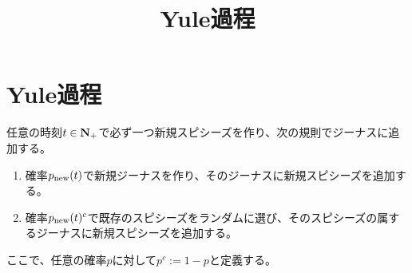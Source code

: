 \documentclass{jsarticle}
\title{Yule過程}
\author{}
\newcommand{\new}{\op{new}}
\begin{document}
\section{Yule過程}\label{sec:Yule過程}

\begin{procedure}\label{pro:Yule過程}
	任意の時刻$t\in\mathbf{N}_+$で必ず一つ新規スピシーズを作り、次の規則でジーナスに追加する。
\begin{enumerate}\setlength{\itemsep}{-1mm} %
	\item 確率$p_\new(t)$で新規ジーナスを作り、そのジーナスに新規スピシーズを追加する。
	\item 確率$p_\new(t)^c$で既存のスピシーズをランダムに選び、そのスピシーズの属するジーナスに新規スピシーズを追加する。
\end{enumerate} %
ここで、任意の確率$p$に対して$p^c:=1-p$と定義する。
\EOP
\end{procedure}
\end{document}
